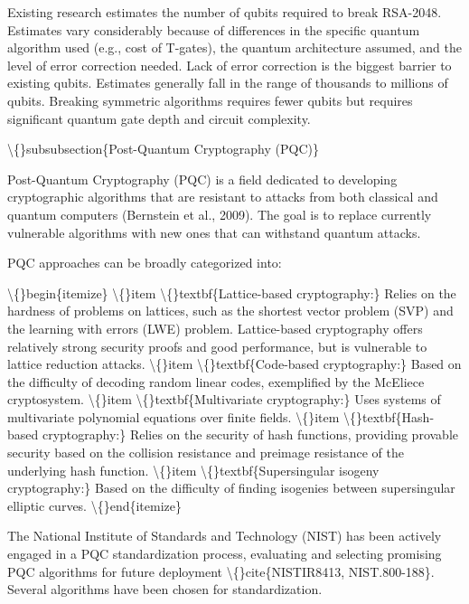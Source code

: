 \documentclass{article}
\begin{document}
Existing research estimates the number of qubits required to break RSA-2048. Estimates vary considerably because of differences in the specific quantum algorithm used (e.g., cost of T-gates), the quantum architecture assumed, and the level of error correction needed. Lack of error correction is the biggest barrier to existing qubits. Estimates generally fall in the range of thousands to millions of qubits. Breaking symmetric algorithms requires fewer qubits but requires significant quantum gate depth and circuit complexity.

\textbackslash\{\}subsubsection\{Post-Quantum Cryptography (PQC)\}

Post-Quantum Cryptography (PQC) is a field dedicated to developing cryptographic algorithms that are resistant to attacks from both classical and quantum computers (Bernstein et al., 2009). The goal is to replace currently vulnerable algorithms with new ones that can withstand quantum attacks.

PQC approaches can be broadly categorized into:

\textbackslash\{\}begin\{itemize\}
    \textbackslash\{\}item \textbackslash\{\}textbf\{Lattice-based cryptography:\} Relies on the hardness of problems on lattices, such as the shortest vector problem (SVP) and the learning with errors (LWE) problem. Lattice-based cryptography offers relatively strong security proofs and good performance, but is vulnerable to lattice reduction attacks.
    \textbackslash\{\}item \textbackslash\{\}textbf\{Code-based cryptography:\} Based on the difficulty of decoding random linear codes, exemplified by the McEliece cryptosystem.
    \textbackslash\{\}item \textbackslash\{\}textbf\{Multivariate cryptography:\} Uses systems of multivariate polynomial equations over finite fields.
    \textbackslash\{\}item \textbackslash\{\}textbf\{Hash-based cryptography:\} Relies on the security of hash functions, providing provable security based on the collision resistance and preimage resistance of the underlying hash function.
    \textbackslash\{\}item \textbackslash\{\}textbf\{Supersingular isogeny cryptography:\} Based on the difficulty of finding isogenies between supersingular elliptic curves.
\textbackslash\{\}end\{itemize\}

The National Institute of Standards and Technology (NIST) has been actively engaged in a PQC standardization process, evaluating and selecting promising PQC algorithms for future deployment \textbackslash\{\}cite\{NISTIR8413, NIST.800-188\}. Several algorithms have been chosen for standardization.
\end{document}
